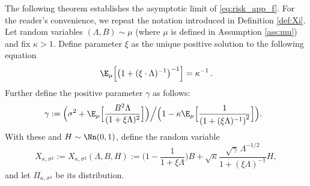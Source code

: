 The following theorem establishes the asymptotic limit of \eqref{eq:risk_app_f}. For the reader's convenience, we repeat the notation introduced in Definition \ref{def:Xi}.
Let random variables $(\Lambda,B)\sim \mu$ (where $\mu$ is defined in Assumption \ref{ass:mu}) and fix $\kappa>1$. Define parameter $\xi$ as the unique positive solution to the following equation
$$
\E_{\mu}\Big[ \big({1+(\xi\cdot\Lambda)^{-1}}\big)^{-1} \Big] = {\kappa^{-1}}\,.
$$
Further define the positive parameter $\gamma$ as follows:
$$
\hspace{-0.1in}\gamma := 
\Big({\sigma^2 + \E_{\mu}\Big[\frac{B^2\Lambda}{(1+\xi\Lambda)^2}\Big]}\Big)\Big/\Big({1-\kappa\E_{\mu}\Big[\frac{1}{\left(1+(\xi\Lambda)^{-1}\right)^2}\Big]}\Big).
$$
With these and $H\sim\Nn(0,1)$, define the random variable
$$
X_{\kappa,\sigma^2}:=X_{\kappa,\sigma^2}(\Lambda,B,H) := \Big(1-\frac{1}{1+ \xi\Lambda}\Big) B + \sqrt{\kappa}\frac{\sqrt{\gamma}\,\Lambda^{-1/2}}{1+(\xi\Lambda)^{-1}} H, 
$$
and let $\Pi_{\kappa,\sigma^2}$ be its distribution.


%

